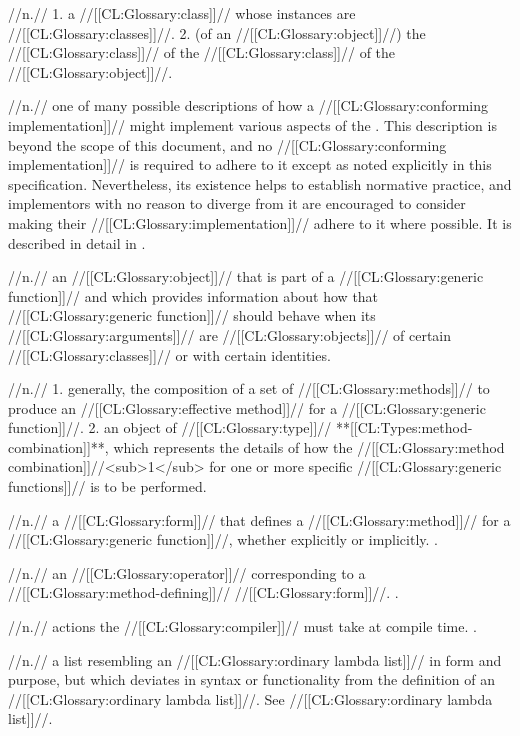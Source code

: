  //n.// 1. a //[[CL:Glossary:class]]// whose instances are //[[CL:Glossary:classes]]//. 2. (of an //[[CL:Glossary:object]]//) the //[[CL:Glossary:class]]// of the //[[CL:Glossary:class]]// of the //[[CL:Glossary:object]]//.
 
 //n.// one of many possible descriptions of how a //[[CL:Glossary:conforming implementation]]// might implement various aspects of the \CLOS. This description is beyond the scope of this document, and no //[[CL:Glossary:conforming implementation]]// is required to adhere to it except as noted explicitly in this specification. Nevertheless, its existence helps to establish normative practice, and implementors with no reason to diverge from it are encouraged to consider making their //[[CL:Glossary:implementation]]// adhere to it where possible. It is described in detail in \MetaObjectProtocol.

 //n.// an //[[CL:Glossary:object]]// that is part of a //[[CL:Glossary:generic function]]// and which provides information about how that //[[CL:Glossary:generic function]]// should behave when its //[[CL:Glossary:arguments]]// are //[[CL:Glossary:objects]]// of certain //[[CL:Glossary:classes]]// or with certain identities.
 
 //n.// 1. generally, the composition of a set of //[[CL:Glossary:methods]]// to produce an //[[CL:Glossary:effective method]]// for a //[[CL:Glossary:generic function]]//. 2. an object of //[[CL:Glossary:type]]// **[[CL:Types:method-combination]]**, which represents the details of how the //[[CL:Glossary:method combination]]//<sub>1</sub> for one or more specific //[[CL:Glossary:generic functions]]// is to be performed.
 
 //n.// a //[[CL:Glossary:form]]// that defines a //[[CL:Glossary:method]]// for a //[[CL:Glossary:generic function]]//, whether explicitly or implicitly. \Seesection\IntroToGFs.

 //n.// an //[[CL:Glossary:operator]]// corresponding to a //[[CL:Glossary:method-defining]]// //[[CL:Glossary:form]]//. \Seefigure\StdMethDefOps.

 //n.// actions the //[[CL:Glossary:compiler]]// must take at compile time. \Seesection\CompilationSemantics.

 //n.// a list resembling an //[[CL:Glossary:ordinary lambda list]]// in form and purpose, but which deviates in syntax or functionality from the definition of an //[[CL:Glossary:ordinary lambda list]]//. See //[[CL:Glossary:ordinary lambda list]]//. 


